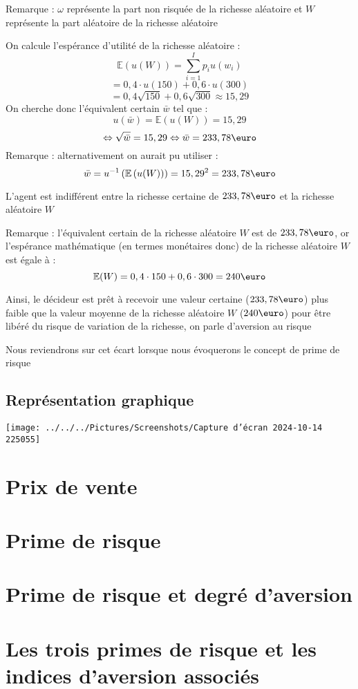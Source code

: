 \documentclass[a4paper, 12pt]{report}
\begin{document}
Remarque : $\omega$ représente la part non risquée de la richesse aléatoire et $W$ représente la part aléatoire de la richesse aléatoire

On calcule l'espérance d'utilité de la richesse aléatoire :
$$
\mathbb{E}\left( u(W) \right)=\sum_{i=1}^{I}p_iu(w_i)
$$
$$
=0,4 \cdot u(150) + 0,6 \cdot u(300)
$$
$$
=0,4 \sqrt{150}+ 0,6\sqrt{300} \approx 15,29
$$
On cherche donc l'équivalent certain $\bar{w}$ tel que :
$$
u(\bar{w})= \mathbb{E}\left( u(W) \right)=15,29
$$
$$
\Leftrightarrow \sqrt{\bar{w}}=15,29 \Leftrightarrow \bar{w} = 233,78 \text{\euro}
$$
Remarque : alternativement on aurait pu utiliser :
$$
\bar{w}=u^{-1}\left( \mathbb{E}\left( u(W) \right) \right)=15,29^2=233,78\text{\euro}
$$

L'agent est indifférent entre la richesse certaine de $233,78\text{\euro}$ et la richesse aléatoire $W$

Remarque : l'équivalent certain de la richesse aléatoire $W$ est de $233,78\text{\euro}$, or l'espérance mathématique (en termes monétaires donc) de la richesse aléatoire $W$ est égale à :
$$
\mathbb{E}(W)=0,4\cdot150+0,6\cdot300=240\text{\euro}
$$

Ainsi, le décideur est prêt à recevoir une valeur certaine ($233,78\text{\euro}$) plus faible que la valeur moyenne de la richesse aléatoire $W$ ($240\text{\euro}$) pour être libéré du risque de variation de la richesse, on parle d'aversion au risque

Nous reviendrons sur cet écart lorsque nous évoquerons le concept de prime de risque

\subsection{Représentation graphique}

\begin{center}
	\texttt{[image: ../../../Pictures/Screenshots/Capture d'écran 2024-10-14 225055]}
\end{center}







\section{Prix de vente}


\section{Prime de risque}


\section{Prime de risque et degré d'aversion}


\section{ Les trois primes de risque et les indices d'aversion associés}
\end{document}
